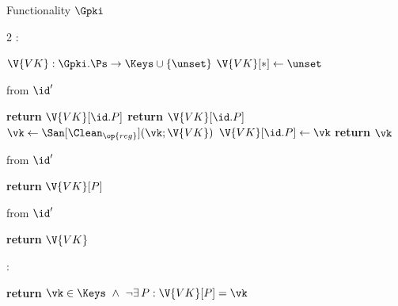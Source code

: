 \begin{interface}[nofloat]{Functionality $\Gpki$ \\
}

{\scriptsize
\setlength{\columnsep}{1.4em}
\begin{multicols}{2}
:
\begin{algorithmic}[1]
\setcounter{contline}{0}\algcont
\State $\V{VK} : \Gpki.\Ps \to \Keys \cup \{\unset\}$
\State $\V{VK}[*] \gets \unset$
\algsave
\end{algorithmic}
\vspace{1.4ex}

 \quad from $\id'$
\begin{algorithmic}[1]
\algcont
{}
  \State \textbf{return} $\V{VK}[\id.P]$ \label{ln:pkipeek}
\EndIf
{}
  \State \textbf{return} $\V{VK}[\id.P]$ \label{ln:pkifixed}
\EndIf
\State $\vk \gets \San[\Clean_{\op{reg}}](\vk; \V{VK})$
\State $\V{VK}[\id.P] \gets \vk$ \label{ln:pkiwrite}
\State \textbf{return} $\vk$
\algsave
\end{algorithmic}
\vspace{1.4ex}

\columnbreak

 \quad from $\id'$
\begin{algorithmic}[1]
\algcont
\State \textbf{return} $\V{VK}[P]$
\algsave
\end{algorithmic}
\vspace{1.4ex}

 \quad from $\id'$
\begin{algorithmic}[1]
\algcont
\State \textbf{return} $\V{VK}$
\algsave
\end{algorithmic}
\vspace{1.4ex}

:
\begin{algorithmic}[1]
\algcont
\State \textbf{return} $\vk \in \Keys \ \wedge\ \neg\exists\, P : \V{VK}[P] = \vk$
\algsave
\end{algorithmic}
\end{multicols}}
\end{interface}
